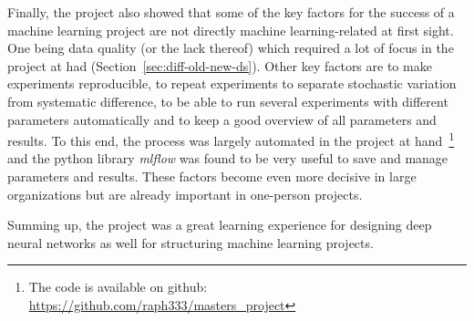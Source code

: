 Finally, the project also showed that some of the key factors for the success of a machine learning project are not directly machine learning-related at first sight. One being data quality (or the lack thereof) which required a lot of focus in the project at had (Section~\ref{sec:diff-old-new-ds}). Other key factors are to make experiments reproducible, to repeat experiments to separate stochastic variation from systematic difference, to be able to run several experiments with different parameters automatically and to keep a good overview of all parameters and results. To this end, the process was largely automated in the project at hand~\footnote{The code is available on github: \url{https://github.com/raph333/masters_project}} and the python library \textit{mlflow} was found to be very useful to save and manage parameters and results. These factors become even more decisive in large organizations but are already important in one-person projects.

Summing up, the project was a great learning experience for designing deep neural networks as well for structuring machine learning projects.

